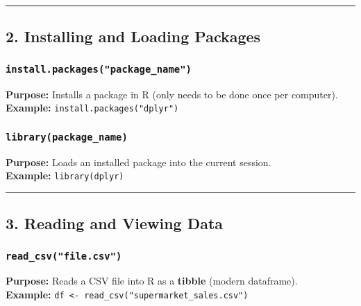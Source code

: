 \documentclass[
  11pt,
]{article}
\begin{document}
\begin{center}\rule{0.5\linewidth}{0.5pt}\end{center}

\subsection{\texorpdfstring{\textbf{2. Installing and Loading
Packages}}{2. Installing and Loading Packages}}\label{installing-and-loading-packages}

\subsubsection{\texorpdfstring{\textbf{\texttt{install.packages("package\_name")}}}{install.packages("package\_name")}}\label{install.packagespackage_name}

\textbf{Purpose:} Installs a package in R (only needs to be done once
per computer).\\
\textbf{Example:} \texttt{install.packages("dplyr")}

\subsubsection{\texorpdfstring{\textbf{\texttt{library(package\_name)}}}{library(package\_name)}}\label{librarypackage_name}

\textbf{Purpose:} Loads an installed package into the current session.\\
\textbf{Example:} \texttt{library(dplyr)}

\begin{center}\rule{0.5\linewidth}{0.5pt}\end{center}

\subsection{\texorpdfstring{\textbf{3. Reading and Viewing
Data}}{3. Reading and Viewing Data}}\label{reading-and-viewing-data}

\subsubsection{\texorpdfstring{\textbf{\texttt{read\_csv("file.csv")}}}{read\_csv("file.csv")}}\label{read_csvfile.csv}

\textbf{Purpose:} Reads a CSV file into R as a \textbf{tibble} (modern
dataframe).\\
\textbf{Example:}
\texttt{df\ \textless{}-\ read\_csv("supermarket\_sales.csv")}
\end{document}
